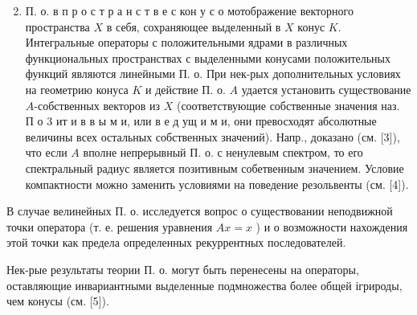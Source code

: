 \documentclass[10pt]{article}
\begin{document}
\begin{enumerate}

  \setcounter{enumi}{1}

  \item П. о. в п р о с т р а н с т в е с кон у с о мотображение векторного пространства $X$ в себя, сохраняющее выделенный в $X$ конус $K$. Интегральные операторы с положительными ядрами в различных функциональных пространствах с выделенными конусами положительных функций являются линейными П. о. При нек-рых дополнительных условиях на геометрию конуса $K$ и действие П. о. $A$ удается установить существование $A$-собственных векторов из $X$ (соответствующие собственные значения наз. П о 3 ит и в в ы м и, или в е д ущ и м и, они превосходят абсолютные величины всех остальных собственных значений). Напр., доказано (см. [3]), что если $A$ вполне непрерывный П. о. с ненулевым спектром, то его спектральный радиус является позитивным собетвенным значением. Условие компактности можно заменить условиями на поведение резольвенты (см. [4]).

\end{enumerate}



В случае велинейных П. о. исследуется вопрос о существовании неподвижной точки оператора (т. е. решения уравнения $A x=x$ ) и о возможности нахождения этой точки как предела определенных рекуррентных последователей.



Нек-рые результаты теории П. о. могут быть перенесены на операторы, оставляющие инвариантными выделенные подмножества более общей ігрироды, чем конусы (см. [5]).
\end{document}
